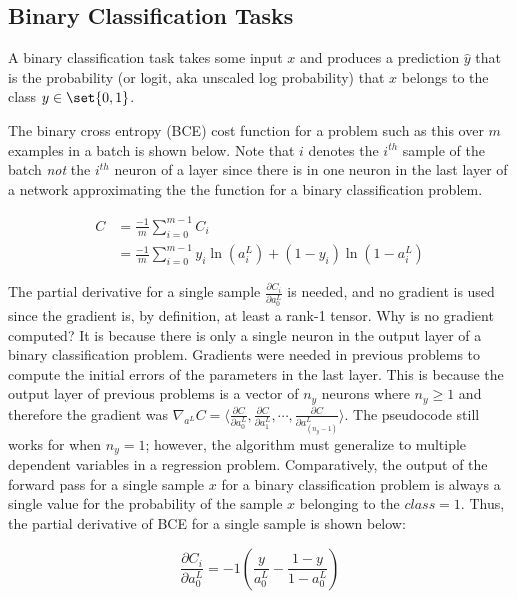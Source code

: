 \documentclass{article}
\DeclarePairedDelimiter\set\{\}
\begin{document}
\subsection{Binary Classification Tasks}

A binary classification task takes some input $x$ and produces a prediction
$\hat{y}$ that is the probability (or logit, aka unscaled log probability) that
$x$ belongs to the class $y \in \set{0, 1}$.

The binary cross entropy (BCE) cost function for a problem such as this over
$m$ examples in a batch is shown below. Note that $i$ denotes
the $i^{th}$ sample of the batch \textit{not} the $i^{th}$ neuron of a layer
since there is in one neuron in the last layer of a network approximating the
the function for a binary classification problem.

\begin{equation}
	\begin{aligned}
		C & = \frac{-1}{m} \sum_{i = 0}^{m-1} {C_{i}}                                                     \\
		  & = \frac{-1}{m} \sum_{i = 0}^{m-1}{ y_{i} \ln{(a_{i}^{L})} + (1 - y_{i}) \ln{(1 - a_{i}^{L})}}
	\end{aligned}
\end{equation}

The partial derivative for a single sample $\frac{\partial C_i}{\partial a_{0}^{L}}$
is needed, and no gradient is used
since the gradient is, by definition, at least a rank-1 tensor. Why is no
gradient computed? It is because there is only a single neuron in the output
layer of a binary classification problem. Gradients were needed in previous
problems to compute the initial errors of the parameters in the last layer.
This is because the output layer of previous problems is a vector of $n_y$ neurons
where $n_y \geq 1$ and therefore the gradient was
${\nabla_{a^{L}} C = \langle \frac{\partial C}{\partial a_0^{L}}, \frac{\partial C}{\partial a_1^{L}}, \cdots, \frac{\partial C}{\partial a_{(n_{y} - 1)}^{L}} \rangle}$.
The pseudocode still works for when $n_y = 1$; however, the algorithm must
generalize to multiple dependent variables in a regression problem. Comparatively,
the output of the forward pass for a single sample $x$ for a binary classification
problem is always a single value for the probability of the sample $x$ belonging
to the $class = 1$.
Thus, the partial derivative of BCE for a single sample is shown below:

\begin{equation}
	\frac{\partial C_i}{\partial a_{0}^{L}} = -1(\frac{y}{a_{0}^{L}} - \frac{ 1 - y}{ 1 - a_{0}^{L} })
\end{equation}
\end{document}
